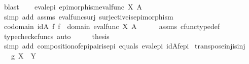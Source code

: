 \begin{isabellebody}
\ blast\isanewline
\ \ \isamarkupfalse%
\ eval{\isacharunderscore}{\kern0pt}epi{\isacharcolon}{\kern0pt}\ {\isachardoublequoteopen}epimorphism{\isacharparenleft}{\kern0pt}{\isacharparenleft}{\kern0pt}eval{\isacharunderscore}{\kern0pt}func\ X\ A{\isacharparenright}{\kern0pt}{\isacharparenright}{\kern0pt}{\isachardoublequoteclose}\isanewline
\ \ \ \ \isamarkupfalse%
\ {\isacharparenleft}{\kern0pt}simp\ add{\isacharcolon}{\kern0pt}\ assms{\isacharparenleft}{\kern0pt}{}{\isacharparenright}{\kern0pt}\ eval{\isacharunderscore}{\kern0pt}func{\isacharunderscore}{\kern0pt}surj\ surjective{\isacharunderscore}{\kern0pt}is{\isacharunderscore}{\kern0pt}epimorphism{\isacharparenright}{\kern0pt}\isanewline
\ \ \isamarkupfalse%
\ {\isachardoublequoteopen}codomain\ {\isacharparenleft}{\kern0pt}{\isacharparenleft}{\kern0pt}id{\isacharparenleft}{\kern0pt}A{\isacharparenright}{\kern0pt}\ {\isasymtimes}\isactrlsub f\ f{\isacharparenright}{\kern0pt}{\isacharparenright}{\kern0pt}\ {\isacharequal}{\kern0pt}\ domain\ {\isacharparenleft}{\kern0pt}{\isacharparenleft}{\kern0pt}eval{\isacharunderscore}{\kern0pt}func\ X\ A{\isacharparenright}{\kern0pt}{\isacharparenright}{\kern0pt}{\isachardoublequoteclose}\isanewline
\ \ \ \ \isamarkupfalse%
\ assms{\isacharparenleft}{\kern0pt}{}{\isacharparenright}{\kern0pt}\ cfunc{\isacharunderscore}{\kern0pt}type{\isacharunderscore}{\kern0pt}def\ \isamarkupfalse%
\ {\isacharparenleft}{\kern0pt}typecheck{\isacharunderscore}{\kern0pt}cfuncs{\isacharcomma}{\kern0pt}\ auto{\isacharparenright}{\kern0pt}\isanewline
\ \ \isamarkupfalse%
\ \isamarkupfalse%
\ {\isacharquery}{\kern0pt}thesis\isanewline
\ \ \ \ \isamarkupfalse%
\ {\isacharparenleft}{\kern0pt}simp\ add{\isacharcolon}{\kern0pt}\ composition{\isacharunderscore}{\kern0pt}of{\isacharunderscore}{\kern0pt}epi{\isacharunderscore}{\kern0pt}pair{\isacharunderscore}{\kern0pt}is{\isacharunderscore}{\kern0pt}epi\ equals\ eval{\isacharunderscore}{\kern0pt}epi\ idA{\isacharunderscore}{\kern0pt}f{\isacharunderscore}{\kern0pt}epi{\isacharparenright}{\kern0pt}\isanewline
{}\isamarkupfalse%
%
\endisatagproof
{\isafoldproof}%
%
\isadelimproof
\isanewline
%
\endisadelimproof
\isanewline
{}\isamarkupfalse%
\ transpose{\isacharunderscore}{\kern0pt}inj{\isacharunderscore}{\kern0pt}is{\isacharunderscore}{\kern0pt}inj{\isacharcolon}{\kern0pt}\isanewline
\ \ \ {\isachardoublequoteopen}g{\isacharcolon}{\kern0pt}\ X\ {\isasymrightarrow}\ Y{\isachardoublequoteclose}\isanewline

\end{isabellebody}
